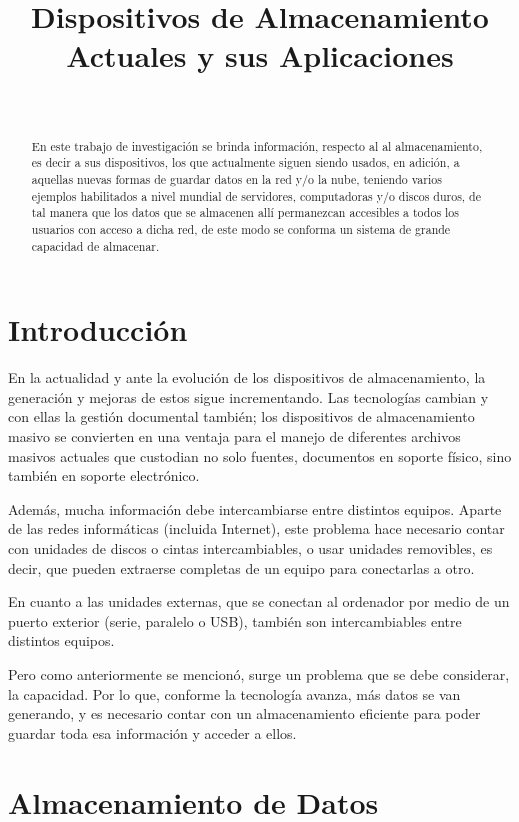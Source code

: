 \documentclass[10pt,journal]{IEEEtran}
\title{Dispositivos de Almacenamiento Actuales y sus Aplicaciones}
\author{
\IEEEauthorblockN{{\Large Angely Mendez Cruz}} \\
\vspace{2mm}
\IEEEauthorblockA{\textit{Organización de Archivos} \\
\textit{Escuela de Informática} \\
\textit{Facultad de Ciencias Físicas y Matemáticas} \\
\textit{Universidad Nacional de Trujillo, \\ Perú }
\\ \vspace{1mm}
t052701020@unitru.edu.pe}}
\begin{document}
\maketitle

    \begin{abstract}
    En este trabajo de investigación se brinda información, respecto al
    al almacenamiento, es decir a sus dispositivos, los que actualmente siguen siendo usados, en adición, a aquellas nuevas formas de guardar datos en la red y/o la nube, teniendo varios ejemplos habilitados a nivel mundial de servidores, computadoras y/o discos duros, de tal manera que los datos que se almacenen allí permanezcan accesibles a todos los usuarios con acceso a dicha red, de este modo se conforma un sistema de grande capacidad de almacenar.
    \end{abstract}
    
    \section{\textbf{Introducción}}
    
    En la actualidad y ante la evolución de los dispositivos de almacenamiento, la generación y mejoras de estos sigue incrementando. Las tecnologías cambian y con ellas la gestión documental también; los dispositivos de almacenamiento masivo se convierten en una ventaja  para el manejo de diferentes archivos masivos actuales que custodian no solo fuentes, documentos en soporte físico, sino también en soporte electrónico.
    
    Además, mucha información debe intercambiarse entre distintos equipos. Aparte de las redes informáticas (incluida Internet), este problema hace necesario contar con unidades de discos o cintas intercambiables, o usar unidades removibles, es decir, que pueden extraerse completas de un equipo para conectarlas a otro.
    
    En cuanto a las unidades externas, que se conectan al ordenador por medio de un puerto exterior (serie, paralelo o USB), también son intercambiables entre distintos equipos.
    
    Pero como anteriormente se mencionó, surge un problema que se debe considerar, la capacidad. Por lo que, conforme la tecnología avanza, más datos se van generando, y es necesario contar con un almacenamiento eficiente para poder guardar toda esa información y acceder a ellos.

    \section{\textbf{Almacenamiento de Datos}}
\end{document}
